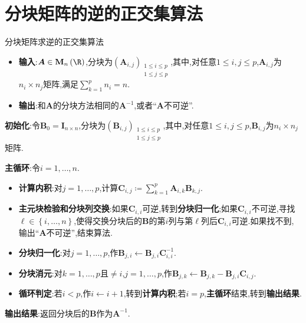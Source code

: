 \section{分块矩阵的逆的正交集算法}

\begin{algorithm}{分块矩阵求逆的正交集算法}{}
	\begin{itemize}
		\item \textbf{输入}:$\boldsymbol{A}\in\mathbf{M}_{n}\left(\R\right)$,分块为$\left(\boldsymbol{A}_{i,j}\right)_{\substack{1\leq i\leq p\\1\leq j\leq p}}$,其中,对任意$1\leq i,j\leq p$,$\boldsymbol{A}_{i,j}$为$n_{i}\times n_{j}$矩阵,满足$\sum\limits_{k=1}^{p}n_{i}=n$.
		\item \textbf{输出}:和$\boldsymbol{A}$的分块方法相同的$\boldsymbol{A}^{-1}$,或者``$\boldsymbol{A}$不可逆''.
	\end{itemize}
	\textbf{初始化}:令$\boldsymbol{B}_{0}=\boldsymbol{I}_{n\times n}$,分块为$\left(\boldsymbol{B}_{i,j}\right)_{\substack{1\leq i\leq p\\1\leq j\leq p}}$,其中,对任意$1\leq i,j\leq p$,$\boldsymbol{B}_{i,j}$为$n_{i}\times n_{j}$矩阵.
	
	\textbf{主循环}:令$i=1,\ldots,n$.
	\begin{itemize}
		\item \textbf{计算内积}:对$j=1,\ldots,p$,计算$\boldsymbol{C}_{i,j}\coloneq\sum\limits_{k=1}^{p}\boldsymbol{A}_{i,k}\boldsymbol{B}_{k,j}$.
		\item \textbf{主元块检验和分块列交换}:如果$\boldsymbol{C}_{i,i}$可逆,转到\textbf{分块归一化};如果$\boldsymbol{C}_{i,i}$不可逆,寻找$\ell\in\left\{i,\ldots,n\right\}$,使得交换分块后的$\boldsymbol{B}$的第$i$列与第$\ell$列后$\boldsymbol{C}_{i,i}$可逆.如果找不到,输出``$\boldsymbol{A}$不可逆'',结束算法.
		\item \textbf{分块归一化}:对$j=1,\ldots,p$,作$\boldsymbol{B}_{j,i}\leftarrow\boldsymbol{B}_{j,i}\boldsymbol{C}_{i,i}^{-1}$.
		\item \textbf{分块消元}:对$k=1,\ldots,p$且$\neq i$,$j=1,\ldots,p$,作$\boldsymbol{B}_{j,k}\leftarrow\boldsymbol{B}_{j,k}-\boldsymbol{B}_{j,i}\boldsymbol{C}_{i,j}$.
		\item \textbf{循环判定}:若$i<p$,作$i\leftarrow i+1$,转到\textbf{计算内积};若$i=p$,\textbf{主循环}结束,转到\textbf{输出结果}.
	\end{itemize}
	\textbf{输出结果}:返回分块后的$\boldsymbol{B}$作为$\boldsymbol{A}^{-1}$.
\end{algorithm}